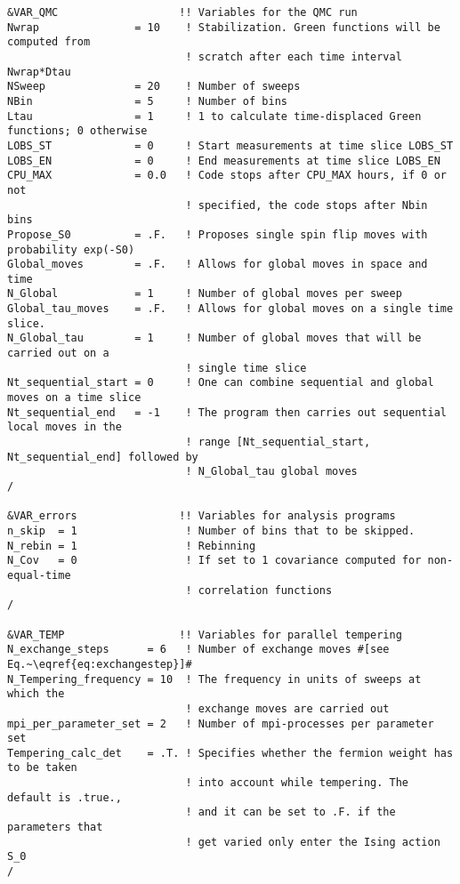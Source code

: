 \begin{lstlisting}[style=fortran,escapechar=\#,breaklines=true]
&VAR_QMC                   !! Variables for the QMC run
Nwrap               = 10    ! Stabilization. Green functions will be computed from 
                            ! scratch after each time interval Nwrap*Dtau
NSweep              = 20    ! Number of sweeps
NBin                = 5     ! Number of bins
Ltau                = 1     ! 1 to calculate time-displaced Green functions; 0 otherwise
LOBS_ST             = 0     ! Start measurements at time slice LOBS_ST
LOBS_EN             = 0     ! End measurements at time slice LOBS_EN
CPU_MAX             = 0.0   ! Code stops after CPU_MAX hours, if 0 or not
                            ! specified, the code stops after Nbin bins
Propose_S0          = .F.   ! Proposes single spin flip moves with probability exp(-S0) 
Global_moves        = .F.   ! Allows for global moves in space and time 
N_Global            = 1     ! Number of global moves per sweep 
Global_tau_moves    = .F.   ! Allows for global moves on a single time slice.  
N_Global_tau        = 1     ! Number of global moves that will be carried out on a 
                            ! single time slice
Nt_sequential_start = 0     ! One can combine sequential and global moves on a time slice
Nt_sequential_end   = -1    ! The program then carries out sequential local moves in the
                            ! range [Nt_sequential_start, Nt_sequential_end] followed by
                            ! N_Global_tau global moves
/

&VAR_errors                !! Variables for analysis programs
n_skip  = 1                 ! Number of bins that to be skipped.
N_rebin = 1                 ! Rebinning  
N_Cov   = 0                 ! If set to 1 covariance computed for non-equal-time
                            ! correlation functions
/  

&VAR_TEMP                  !! Variables for parallel tempering
N_exchange_steps      = 6   ! Number of exchange moves #[see Eq.~\eqref{eq:exchangestep}]#
N_Tempering_frequency = 10  ! The frequency in units of sweeps at which the
                            ! exchange moves are carried out
mpi_per_parameter_set = 2   ! Number of mpi-processes per parameter set
Tempering_calc_det    = .T. ! Specifies whether the fermion weight has to be taken
                            ! into account while tempering. The default is .true.,
                            ! and it can be set to .F. if the parameters that
                            ! get varied only enter the Ising action S_0
/


\end{lstlisting}
